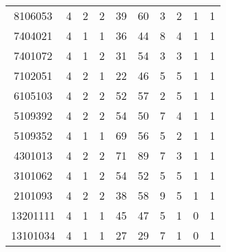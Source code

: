 \begin{landscape}
\begin{center}
\begin{scriptsize}
\begin{longtable}{cccccccccc}
				8106053 & 4 & 2 & 2 & 39 & 60 & 3 & 2 & 1 & 1 \\ 
				7404021 & 4 & 1 & 1 & 36 & 44 & 8 & 4 & 1 & 1 \\ 
				7401072 & 4 & 1 & 2 & 31 & 54 & 3 & 3 & 1 & 1 \\ 
				7102051 & 4 & 2 & 1 & 22 & 46 & 5 & 5 & 1 & 1 \\ 
				6105103 & 4 & 2 & 2 & 52 & 57 & 2 & 5 & 1 & 1 \\ 
				5109392 & 4 & 2 & 2 & 54 & 50 & 7 & 4 & 1 & 1 \\ 
				5109352 & 4 & 1 & 1 & 69 & 56 & 5 & 2 & 1 & 1 \\ 
				4301013 & 4 & 2 & 2 & 71 & 89 & 7 & 3 & 1 & 1 \\ 
				3101062 & 4 & 1 & 2 & 54 & 52 & 5 & 5 & 1 & 1 \\ 
				2101093 & 4 & 2 & 2 & 38 & 58 & 9 & 5 & 1 & 1 \\ 
				13201111 & 4 & 1 & 1 & 45 & 47 & 5 & 1 & 0 & 1 \\ 
				13101034 & 4 & 1 & 1 & 27 & 29 & 7 & 1 & 0 & 1 \\ 
			\end{longtable}
		\end{scriptsize}
	\end{center}
\end{landscape}



